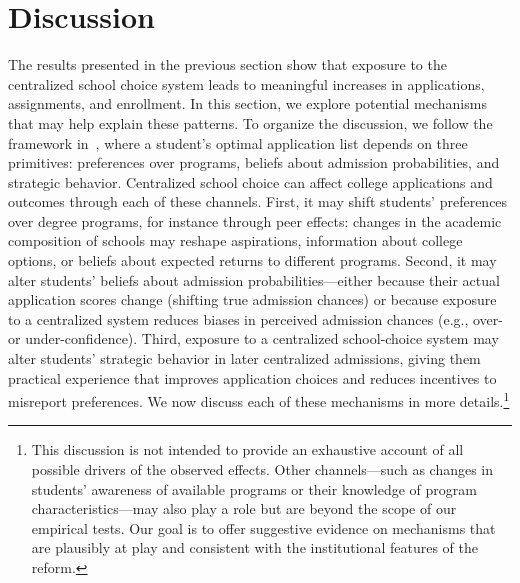 \section{Discussion}\label{sec: discussion}

The results presented in the previous section show that exposure to the centralized school choice system leads to meaningful increases in  applications, assignments, and enrollment. In this section, we explore potential mechanisms that may help explain these patterns. 
To organize the discussion, we follow the framework in~\cite{larroucau2024}, where a student's optimal application list depends on three primitives: preferences over programs, beliefs about admission probabilities, and strategic behavior. Centralized school choice can affect college applications and outcomes through each of these channels. 
First, it may shift students' preferences over degree programs, for instance through peer effects: changes in the academic composition of schools may reshape aspirations, information about college options, or beliefs about expected returns to different programs.
Second, it may alter students' beliefs about admission probabilities—either because their actual application scores change (shifting true admission chances) or because exposure to a centralized system reduces biases in perceived admission chances (e.g., over- or under-confidence). 
Third, exposure to a centralized school‑choice system may alter students’ strategic behavior in later centralized admissions, giving them practical experience that improves application choices and reduces incentives to misreport preferences. We now discuss each of these mechanisms in more details.\footnote{This discussion is not intended to provide an exhaustive account of all possible drivers of the observed effects. Other channels—such as changes in students' awareness of available programs or their knowledge of program characteristics—may also play a role but are beyond the scope of our empirical tests. Our goal is to offer suggestive evidence on mechanisms that are plausibly at play and consistent with the institutional features of the reform. } 






